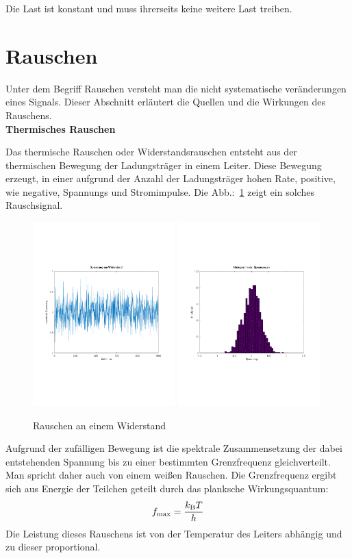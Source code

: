 Die Last ist konstant und muss ihrerseits keine weitere Last treiben.

\section{Rauschen}
Unter dem Begriff Rauschen versteht man die nicht systematische veränderungen
eines Signals.
Dieser Abschnitt erläutert die Quellen und die Wirkungen des Rauschens.\\

\textbf{Thermisches Rauschen}

Das thermische Rauschen oder Widerstandsrauschen entsteht aus der thermischen 
Bewegung der Ladungsträger in einem Leiter.
Diese Bewegung erzeugt, in einer aufgrund der Anzahl der Ladungsträger
hohen Rate, positive, wie negative, Spannungs und Stromimpulse. 
Die Abb.:~\ref{FIG:NOISE} zeigt ein solches Rauschsignal.
\begin{figure}
  \centering
  \includegraphics[clip, width=0.49\textwidth]
  {./../common/Simulation/rauschen/spannung.pdf}
  \includegraphics[clip, width=0.49\textwidth]
  {./../common/Simulation/rauschen/haeufigkeit.pdf}
  \caption{Rauschen an einem Widerstand}\label{FIG:NOISE}
\end{figure}
Aufgrund der zufälligen Bewegung ist die spektrale Zusammensetzung der dabei
entstehenden Spannung bis zu einer bestimmten Grenzfrequenz gleichverteilt.
Man spricht daher auch von einem weißen Rauschen.
Die Grenzfrequenz ergibt sich aus Energie der Teilchen geteilt durch das 
planksche Wirkungsquantum:
\[f_{\max} = \frac{k_{\rm B} T}{h}\]
Die Leistung dieses Rauschens ist von der Temperatur des Leiters abhängig und
zu dieser proportional.

